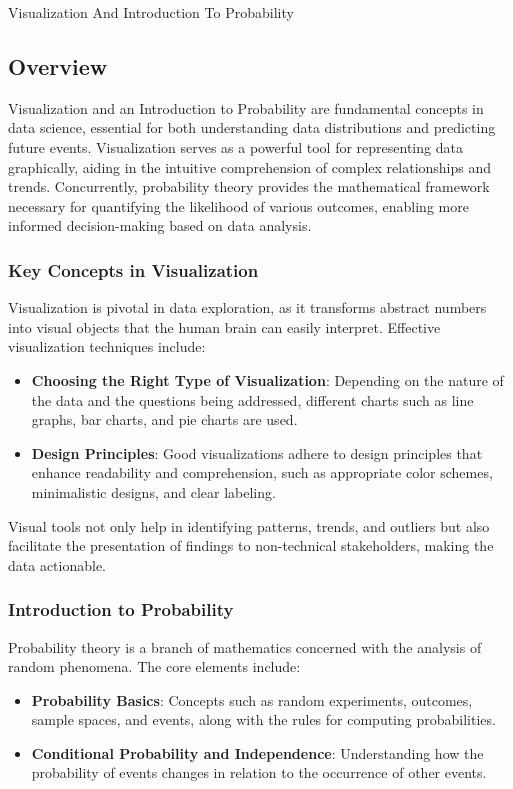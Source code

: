 \begin{notes}{Visualization And Introduction To Probability}
    \subsection*{Overview}

    Visualization and an Introduction to Probability are fundamental concepts in data science, essential for both understanding data distributions and predicting future events. Visualization serves 
    as a powerful tool for representing data graphically, aiding in the intuitive comprehension of complex relationships and trends. Concurrently, probability theory provides the mathematical 
    framework necessary for quantifying the likelihood of various outcomes, enabling more informed decision-making based on data analysis. \vspace*{1em}
    
    \subsubsection*{Key Concepts in Visualization}
    
    Visualization is pivotal in data exploration, as it transforms abstract numbers into visual objects that the human brain can easily interpret. Effective visualization techniques include:
    \begin{itemize}
        \item \textbf{Choosing the Right Type of Visualization}: Depending on the nature of the data and the questions being addressed, different charts such as line graphs, bar charts, and pie charts are used.
        \item \textbf{Design Principles}: Good visualizations adhere to design principles that enhance readability and comprehension, such as appropriate color schemes, minimalistic designs, and clear labeling.
    \end{itemize}
    
    Visual tools not only help in identifying patterns, trends, and outliers but also facilitate the presentation of findings to non-technical stakeholders, making the data actionable.
    
    \subsubsection*{Introduction to Probability}
    
    Probability theory is a branch of mathematics concerned with the analysis of random phenomena. The core elements include:
    \begin{itemize}
        \item \textbf{Probability Basics}: Concepts such as random experiments, outcomes, sample spaces, and events, along with the rules for computing probabilities.
        \item \textbf{Conditional Probability and Independence}: Understanding how the probability of events changes in relation to the occurrence of other events.
    \end{itemize}
    

\end{notes}
